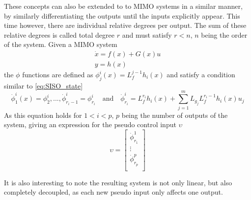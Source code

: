 These concepts can also be extended to to MIMO systems in a similar manner, by similarly differentiating the outputs until the inputs explicitly appear. This time however, there are individual relative degrees per output. The sum of these relative degrees is called total degree $r$ and must satisfy $r<n$, $n$ being the order of the system. Given a MIMO system 
\begin{gather}
\dot{x} = f(x) + G(x)u\\
y=h(x)
\end{gather}
the $\phi$ functions are defined as $\phi^i_j(x)=L^{j-1}_fh_i(
x)$ and satisfy a condition similar to \ref{eq:SISO_state} 
\begin{equation}
\dot{\phi}^i_1(x)=\phi^i_2,...,\dot{\phi}^i_{r_i-1}=\phi^i_{r_i} \quad \text{and} \quad \dot{\phi}^i_{r_i}=L_f^{r_i}h_i(x)+\sum^m_{j=1}L_{g_j}L^{r_i-1}_fh_i(x)u_j
\end{equation}
As this equation holds for $1<i<p$, $p$ being the number of outputs of the system, giving an expression for the pseudo control input $\upsilon$
\begin{equation}
\upsilon = 
\begin{bmatrix}
\dot{\phi}^1_{r_1}\\
\vdots\\
\dot{\phi}^p_{r_p}\\
\end{bmatrix}
\end{equation}

It is also interesting to note the resulting system is not only linear, but also completely decoupled, as each new pseudo input only affects one output.

